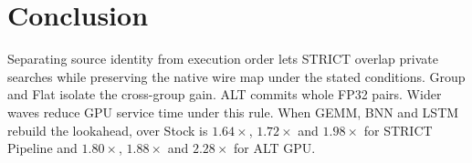 \section{Conclusion}
Separating source identity from execution order lets STRICT overlap private searches while preserving the native wire map under the stated conditions. Group and Flat isolate the cross-group gain. ALT commits whole FP32 pairs. Wider waves reduce GPU service time under this rule. When GEMM, BNN and LSTM rebuild the lookahead, \processspeedup{} over Stock is $1.64\times$, $1.72\times$ and $1.98\times$ for STRICT Pipeline and $1.80\times$, $1.88\times$ and $2.28\times$ for ALT GPU.
